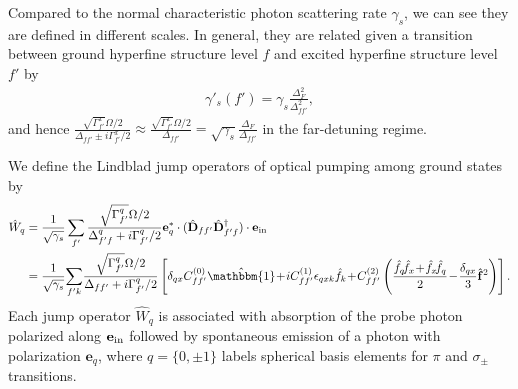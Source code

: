 \documentclass[preprint,aps,pra,onecolumn,superscriptaddress]{revtex4-1} %
\def\bra#1{\langle{#1}\rvert}%
\def\ket#1{\lvert{#1}\rangle}%
\def\Braket#1#2{\mathinner{\langle{#1}\! \mid\! {#2} \rangle}}
\begin{document}
\begin{appendix}
Compared to the normal characteristic photon scattering rate $ \gamma_s $, we can see they are defined in different scales.
In general, they are related given a transition between ground hyperfine structure level $ f $ and excited hyperfine structure level $ f' $ by 
\begin{align}
\gamma'_s(f')=\gamma_s \frac{\Delta_F^2}{\Delta_{ff'}^2},
\end{align}
and hence $ \frac{\sqrt{\Gamma_{f'}^x}\Omega/2}{\Delta_{ff'}\pm i\Gamma_{f'}^x/2}\approx \frac{\sqrt{\Gamma_{f'}^x}\Omega/2}{\Delta_{ff'}}=\sqrt{\gamma_s}\frac{\Delta_F}{\Delta_{ff'}} $ in the far-detuning regime.

We define the Lindblad jump operators of optical pumping among ground states by~\cite{Deutsch2010a}
	\begin{align}\label{Eq::Wq_Faraday}
		\hat{W}_q &= \frac{1}{\sqrt{\gamma_s}}\sum_{f'}\frac{\sqrt{\Gamma_{f'}^q}\Omega/2}{\Delta_{f'f}^q+i\Gamma_{f'}^q/2}\mathbf{e}_q^*\cdot(\hat{\mathbf{D}}_{ff'}  \hat{\mathbf{D}}^\dagger_{f'f} )\cdot\mathbf{e}_{\rm in} \\
		&= \frac{1}{\sqrt{\gamma_s}}\!\sum_{f'k}\! \frac{\sqrt{\Gamma_{f'}^q}\Omega/2}{\Delta_{ff'}+i\Gamma_{f'}^q/2} \left[\delta_{qx}C_{ff'}^{(0)}\hat{\mathbbm{1}} \!+\! iC_{ff'}^{(1)}\epsilon_{qxk}\hat{f}_k \!+\! C_{ff'}^{(2)}\left(\frac{\hat{f}_q\!\hat{f}_{x}\!+\!\hat{f}_{x}\!\hat{f}_q }{2} \!-\! \frac{\delta_{qx}}{3}\hat{\mathbf{f}}^2 \right) \right].
	\end{align}
Each jump operator $\hat{W}_q$ is associated with absorption of the probe photon polarized along $ \mathbf{e}_{\rm in} $ followed by spontaneous emission of a photon with polarization $ \mathbf{e}_q $, where $q= \{0,\pm 1\}$ labels spherical basis elements for $\pi$ and $ \sigma_\pm$ transitions. 


\end{appendix}
\end{document}
